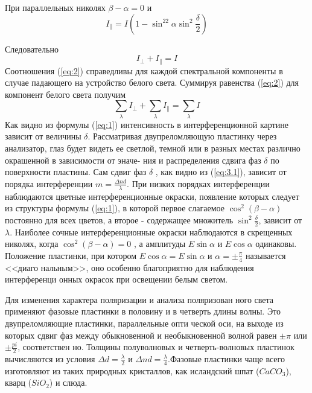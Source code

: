 При параллельных николях $\beta-\alpha=0$ и 
\begin{equation}
	\label{eq:3par}
	I_{\|}=I\left(1-\sin^22\alpha \sin^2\frac{\delta}{2}\right)
\end{equation}

Следовательно
\begin{equation}
\label{eq:2}
I_{\bot}+I_{\|}=I	
\end{equation}
Соотношения (\ref{eq:2}) справедливы для каждой спектральной компоненты в случае падающего на устройство белого света. Суммируя равенства (\ref{eq:2})
для компонент белого света получим
\begin{equation}
	\sum_{\lambda} I_{\bot}+\sum_{\lambda} I_{\|}=\sum_{\lambda} I
\end{equation}
Как видно из формулы (\ref{eq:1}) интенсивность в интерференционной
картине зависит от величины $\delta$. Рассматривая двупреломляющую
пластинку через анализатор, глаз будет видеть ее светлой, темной
или в разных местах различно окрашенной в зависимости от эначе-
ния и распределения сдвига фаз $\delta$ по поверхности пластины.
Сам сдвиг фаз $\delta$ , как видно из (\ref{eq:3.1}), зависит от порядка интерференции
 $m=\frac{\Delta nd}{\lambda}$. При низких порядках интерферен­ции наблюдаются цветные интерференционные окраски, появление ко­торых следует из структуры формулы (\ref{eq:1}), в которой первое слага­емое $\cos^2(\beta-\alpha)$ постоянно для всех цветов, а второе -
содержащее множитель $\sin^2\frac{\delta}{2}$, зависит от $\lambda$. Наиболее сочные интерференционные окраски наблюдаются в скрещенных
николях, когда $\cos^2(\beta-\alpha)=0$ , а амплитуды $E\sin\alpha$
и $E\cos\alpha$ одинаковы. Положение пластинки, при котором
$E\cos\alpha=E\sin\alpha$ и $\alpha=\pm\frac{\pi}{4}$ называется <<диаго­
нальным>>, оно особенно благоприятно для наблюдения интерференци­
онных окрасок при освещении белым светом.

Для изменения характера поляризации и анализа поляризован­
ного света применяют фазовые пластинки в половину и в четверть
длины волны. Это двупреломляющие пластинки, параллельные опти­
ческой оси, на выходе из которых сдвиг фаз между обыкновенной и
необыкновенной волной равен $\pm\pi$ или $\pm\frac{pi}{2}$, соответствен­
но. Толщины полуволновых и четверть-волновых пластинок вычисляются из условия $\Delta d=\frac{\lambda}{2}$ и $\Delta nd=\frac{\lambda}{4}$.Фазовые
пластинки чаще всего изготовляют из таких природных кристаллов,
как исландский шпат ($CaCO_3$), кварц ($SiO_2$) и слюда.

